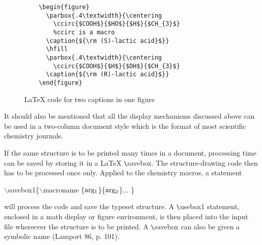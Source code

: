  \begin{figure}\centering
 \begin{verbatim}
    \begin{figure}                            
      \parbox{.4\textwidth}{\centering        
        \ccirc{$COOH$}{$HO$}{$H$}{$CH_{3}$}     
        %ccirc is a macro                     
      \caption{${\rm (S)-lactic acid}$}}  
      \hfill                                  
      \parbox{.4\textwidth}{\centering        
        \ccirc{$COOH$}{$H$}{$OH$}{$CH_{3}$}   
      \caption{${\rm (R)-lactic acid}$}}  
    \end{figure}                                                            
 \end{verbatim}
 \caption{LaTeX code for two captions in one figure}
 \end{figure}
 
 It should also be mentioned that all the display mechanisms
 discussed above can be used in a two-column document style
 which is the format of most scientific chemistry journals.   

 If the same structure is to be printed many times in a
 document, processing time can be saved by storing it in a
 LaTeX \verb+\+savebox. The structure-drawing code then has to 
 be processed once only. Applied to the chemistry macros,
 a statement \\
 \centerline{$\backslash $savebox1\{$\backslash $macroname
      \{${\rm arg_{1}}$\}\{${\rm arg_{2}}$\}$\ldots $ \}  }
 will process the code and save the typeset structure.
 A \verb+\+usebox1 statement, enclosed in a math display or
 figure environment, is then placed into the input file
 whereever the structure is to be printed. A \verb+\+savebox
 can also be given a symbolic name (Lamport 86, p. 101).

 

